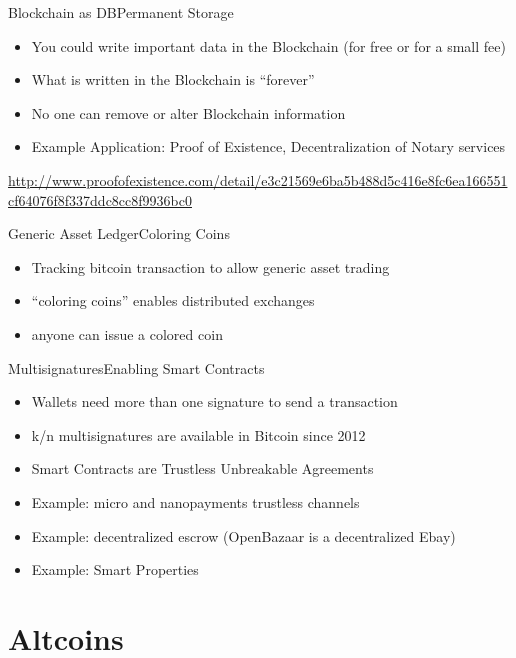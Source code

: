 \documentclass[english,compress]{beamer}
\begin{document}
\begin{frame}{Blockchain as DB}{Permanent Storage}
\begin{itemize}
 \item You could write important data in the Blockchain (for free or for a small fee)
 \item What is written in the Blockchain is ``forever''
 \item No one can remove or alter Blockchain information
 \item Example Application: Proof of Existence, Decentralization of Notary services 
\end{itemize}
 
\begin{tiny}
 \url{http://www.proofofexistence.com/detail/e3c21569e6ba5b488d5c416e8fc6ea166551cf64076f8f337ddc8cc8f9936bc0}
\end{tiny}
\end{frame}

\begin{frame}{Generic Asset Ledger}{Coloring Coins}
\begin{itemize}
\item Tracking bitcoin transaction to allow generic asset trading
\item ``coloring coins'' enables distributed exchanges
\item anyone can issue a colored coin
\end{itemize}
\vfill
{}
\end{frame}


\begin{frame}{Multisignatures}{Enabling Smart Contracts}
\begin{itemize}
\item Wallets need more than one signature to send a transaction
\item k/n multisignatures are available in Bitcoin since 2012
\item Smart Contracts are Trustless Unbreakable Agreements
\item Example: micro and nanopayments trustless channels
\item Example: decentralized escrow (OpenBazaar is a decentralized Ebay)
\item Example: Smart Properties
\end{itemize}

\end{frame}

\section{Altcoins}
\end{document}
